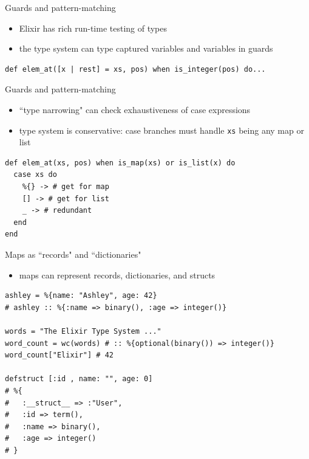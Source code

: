 \documentclass[
  ignorenonframetext,
  aspectratio=169]{beamer}
\newcommand{\passthrough}[1]{#1}
\providecommand{\tightlist}{%
  \setlength{\itemsep}{0pt}\setlength{\parskip}{0pt}}
\begin{document}
\begin{frame}[fragile]{Guards and pattern-matching}
\label{guards-and-pattern-matching}
\begin{itemize}
\tightlist
\item
  Elixir has rich run-time testing of types
\item
  the type system can type captured variables and variables in guards
\end{itemize}

\begin{lstlisting}
def elem_at([x | rest] = xs, pos) when is_integer(pos) do...
\end{lstlisting}
\end{frame}

\begin{frame}[fragile]{Guards and pattern-matching}
\label{guards-and-pattern-matching-1}
\begin{itemize}
\tightlist
\item
  ``type narrowing" can check exhaustiveness of case expressions
\item
  type system is conservative: case branches must handle
  \passthrough{\lstinline!xs!} being any map or list
\end{itemize}

\begin{lstlisting}
def elem_at(xs, pos) when is_map(xs) or is_list(x) do
  case xs do
    %{} -> # get for map
    [] -> # get for list
    _ -> # redundant
  end
end
\end{lstlisting}
\end{frame}

\begin{frame}[fragile]{Maps as ``records" and ``dictionaries"}
\label{maps-as-records-and-dictionaries}
\begin{itemize}
\tightlist
\item
  maps can represent records, dictionaries, and structs
\end{itemize}

\begin{lstlisting}
ashley = %{name: "Ashley", age: 42}
# ashley :: %{:name => binary(), :age => integer()}

words = "The Elixir Type System ..."
word_count = wc(words) # :: %{optional(binary()) => integer()}
word_count["Elixir"] # 42

defstruct [:id , name: "", age: 0]
# %{
#   :__struct__ => :"User",
#   :id => term(),
#   :name => binary(),
#   :age => integer()
# }
\end{lstlisting}
\end{frame}
\end{document}
